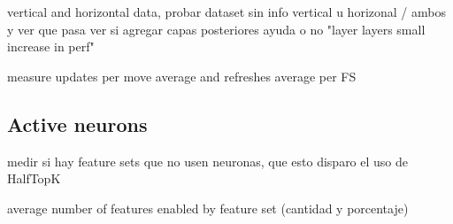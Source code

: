 vertical and horizontal data, probar dataset sin info vertical u horizonal / ambos y ver que pasa
ver si agregar capas posteriores ayuda o no "layer layers small increase in perf"

measure updates per move average and refreshes average per FS



\subsection{Active neurons}

medir si hay feature sets que no usen neuronas, que esto disparo el uso de HalfTopK

average number of features enabled by feature set (cantidad y porcentaje)




